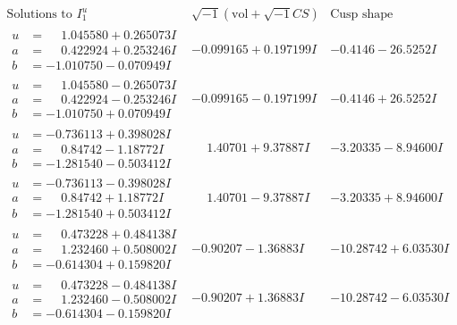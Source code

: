 \documentclass[1p]{elsarticle_modified}
\theoremstyle{definition}
\newcommand{\I}{\sqrt{-1}}
\begin{document}
$$\begin{array}{c|c|c}  
\text{Solutions to }I^u_{1}& \I (\text{vol} + \sqrt{-1}CS) & \text{Cusp shape}\\
 \hline 
\begin{aligned}
u &= \phantom{-}1.045580 + 0.265073 I \\
a &= \phantom{-}0.422924 + 0.253246 I \\
b &= -1.010750 - 0.070949 I\end{aligned}
 & -0.099165 + 0.197199 I & -0.4146 - 26.5252 I \\ \hline\begin{aligned}
u &= \phantom{-}1.045580 - 0.265073 I \\
a &= \phantom{-}0.422924 - 0.253246 I \\
b &= -1.010750 + 0.070949 I\end{aligned}
 & -0.099165 - 0.197199 I & -0.4146 + 26.5252 I \\ \hline\begin{aligned}
u &= -0.736113 + 0.398028 I \\
a &= \phantom{-}0.84742 - 1.18772 I \\
b &= -1.281540 - 0.503412 I\end{aligned}
 & \phantom{-}1.40701 + 9.37887 I & -3.20335 - 8.94600 I \\ \hline\begin{aligned}
u &= -0.736113 - 0.398028 I \\
a &= \phantom{-}0.84742 + 1.18772 I \\
b &= -1.281540 + 0.503412 I\end{aligned}
 & \phantom{-}1.40701 - 9.37887 I & -3.20335 + 8.94600 I \\ \hline\begin{aligned}
u &= \phantom{-}0.473228 + 0.484138 I \\
a &= \phantom{-}1.232460 + 0.508002 I \\
b &= -0.614304 + 0.159820 I\end{aligned}
 & -0.90207 - 1.36883 I & -10.28742 + 6.03530 I \\ \hline\begin{aligned}
u &= \phantom{-}0.473228 - 0.484138 I \\
a &= \phantom{-}1.232460 - 0.508002 I \\
b &= -0.614304 - 0.159820 I\end{aligned}
 & -0.90207 + 1.36883 I & -10.28742 - 6.03530 I \\ \hline\begin{aligned}

\end{aligned}
\end{array}$$
\end{document}
